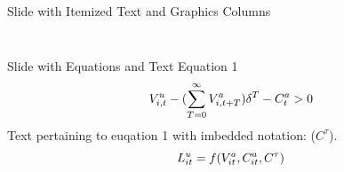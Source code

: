 \documentclass[newPxFont]{beamer}
\begin{document}
\begin{frame}[c]{Slide with Itemized Text and Graphics Columns}
\begin{columns}
\begin{column}{.6\linewidth}
\begin{figure}
			\end{figure}
		\end{column}
	\end{columns}
\end{frame}


\begin{frame}{Slide with Equations and Text}
	Equation 1
	\begin{equation}{\label{eq1}}
	V_{i,t}^{u}-(\sum\limits_{T=0}^{\infty}V_{i,t+T}^{a})\delta^{T}-C_{t}^{a}>0   
	\end{equation}
	Text pertaining to euqation 1 with imbedded notation: ($C^{\tau}$).
	\begin{equation}{\label{eq2}}
	L_{it}^{u}=f(V_{it}^{a},C_{it}^{a},C^{\tau})
	\end{equation}
\end{frame}


\end{document}
